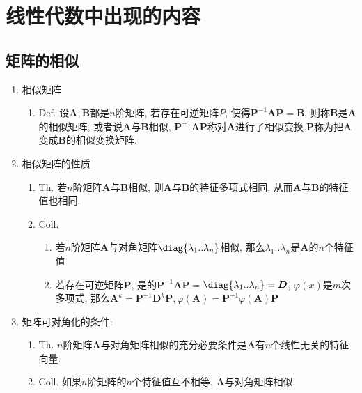 \section{线性代数中出现的内容}

\subsection{矩阵的相似}
\begin{enumerate}
\item 相似矩阵
\begin{enumerate}
\item Def. 设$\boldsymbol{A},\boldsymbol{B}$都是$n$阶矩阵, 若存在可逆矩阵$P$, 使得$\boldsymbol{P}^{-1}\boldsymbol{AP}=\boldsymbol{B}$,
则称$\boldsymbol{B}$是$\boldsymbol{A}$的相似矩阵, 或者说$\boldsymbol{A}$与$\boldsymbol{B}$相似,
$\boldsymbol{P}^{-1}\boldsymbol{AP}$称对\textbf{$\boldsymbol{A}$}进行了相似变换.$\boldsymbol{P}$称为把$\boldsymbol{A}$变成$\boldsymbol{B}$的相似变换矩阵.
\end{enumerate}
\item 相似矩阵的性质
\begin{enumerate}
\item Th. 若$n$阶矩阵$\boldsymbol{A}$与$\boldsymbol{B}$相似, 则$\boldsymbol{A}$与$\boldsymbol{B}$的特征多项式相同,
从而$\boldsymbol{A}$与$\boldsymbol{B}$的特征值也相同. 
\item Coll. 
\begin{enumerate}
\item 若$n$阶矩阵$\boldsymbol{A}$与对角矩阵$\diag{\lambda_{1}..\lambda_{n}}$相似,
那么$\lambda_{1}..\lambda_{n}$是$\boldsymbol{A}$的$n$个特征值
\item 若存在可逆矩阵$\boldsymbol{P}$, 是的$\boldsymbol{P}^{-1}\boldsymbol{AP}=$$\diag{\lambda_{1}..\lambda_{n}}=\boldsymbol{D}$,
$\varphi(x)$是$m$次多项式, 那么$\boldsymbol{A}^{k}=\boldsymbol{P}^{-1}\boldsymbol{D}^{k}\boldsymbol{P},\varphi(\boldsymbol{A})=\boldsymbol{P}^{-1}\varphi(\boldsymbol{A})\boldsymbol{P}$
\end{enumerate}
\end{enumerate}
\item 矩阵可对角化的条件: 
\begin{enumerate}
\item Th. $n$阶矩阵$\boldsymbol{A}$与对角矩阵相似的充分必要条件是$\boldsymbol{A}$有$n$个线性无关的特征向量. 
\item Coll. 如果$n$阶矩阵的$n$个特征值互不相等, $\boldsymbol{A}$与对角矩阵相似. 
\end{enumerate}
\end{enumerate}

